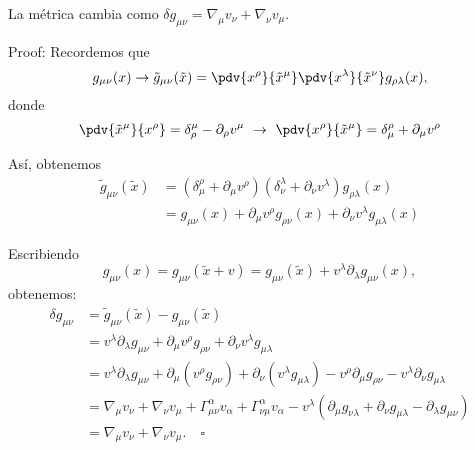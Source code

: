 \documentclass[../main]{subfiles}
\begin{document}
\begin{adjustwidth}{0pt}{-100pt}
\proposicion{} La métrica cambia como $\delta g_{\mu\nu}=\nabla_{\mu} v_{\nu}+\nabla_{\nu} v_{\mu}$.

Proof: Recordemos que 
\begin{equation}
    g_{\mu\nu}(x) \rightarrow \tilde{g}_{\mu\nu}(\tilde{x}) = \pdv{x^{\rho}}{\tilde{x}^{\mu}} \pdv{x^{\lambda}}{\tilde{x}^{\nu}}g_{\rho\lambda}(x),
\end{equation}
donde 
\begin{equation}
    \pdv{\tilde{x}^{\mu}}{x^{\rho}}=\delta^{\mu}_{\rho}-\partial_{\rho} v^{\mu} \ \rightarrow \ \pdv{x^{\rho}}{\tilde{x}^{\mu}}=\delta^{\rho}_{\mu}+\partial_{\mu}v^{\rho}
\end{equation}

Así, obtenemos 
\begin{equation}
    \begin{aligned}
        \tilde{g}_{\mu\nu}(\tilde{x})&=\left(\delta^{\rho}_{\mu}+\partial_{\mu}v^{\rho}\right)\left(\delta^{\lambda}_{\nu}+\partial_{\nu}v^{\lambda}\right)g_{\rho\lambda}(x)\\
        &=g_{\mu\nu}(x)+\partial_{\mu}v^{\rho}g_{\rho\nu}(x)+\partial_{\nu}v^{\lambda}g_{\mu\lambda}(x)
    \end{aligned}
\end{equation}

Escribiendo 
\begin{equation}
    g_{\mu\nu}(x)=g_{\mu\nu}(\tilde{x}+v)=g_{\mu\nu}(\tilde{x})+v^{\lambda}\partial_{\lambda} g_{\mu\nu}(x),
\end{equation}
obtenemos:
\begin{equation}
    \begin{aligned}
        \delta g_{\mu\nu}&=\tilde{g}_{\mu\nu}(\tilde{x})-g_{\mu\nu}(\tilde{x})\\
        &=v^{\lambda}\partial_{\lambda} g_{\mu\nu}+\partial_{\mu}v^{\rho}g_{\rho\nu}+\partial_{\nu}v^{\lambda}g_{\mu\lambda}\\
        &=v^{\lambda}\partial_{\lambda} g_{\mu\nu}+\partial_{\mu}(v^{\rho}g_{\rho\nu})+\partial_{\nu}(v^{\lambda}g_{\mu\lambda})-v^{\rho}\partial_{\mu} g_{\rho\nu}-v^{\lambda} \partial_{\nu}g_{\mu\lambda}\\
        &=\nabla_{\mu} v_{\nu}+\nabla_{\nu}v_{\mu}+\Gamma^{\alpha}_{\mu\nu}v_{\alpha}+\Gamma^{\alpha}_{\nu\mu}v_{\alpha}-v^{\lambda}(\partial_{\mu}g_{\nu\lambda}+\partial_{\nu}g_{\mu\lambda}-\partial_{\lambda}g_{\mu\nu})\\
        &=\nabla_{\mu} v_{\nu}+\nabla_{\nu}v_{\mu}. \quad \square 
    \end{aligned}
\end{equation}


\end{adjustwidth}
\end{document}
